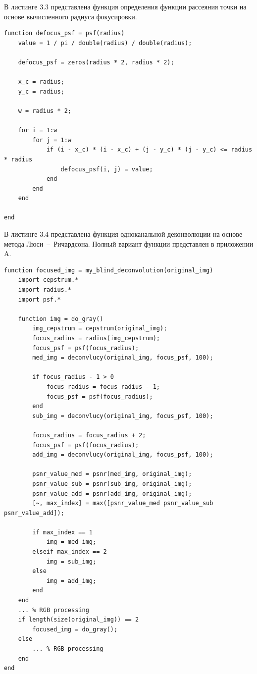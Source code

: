 В листинге 3.3 представлена функция определения функции рассеяния точки на основе вычисленного радиуса фокусировки.

\begin{lstlisting}[caption={Функция определения ФРТ}]
function defocus_psf = psf(radius)
	value = 1 / pi / double(radius) / double(radius);
	
	defocus_psf = zeros(radius * 2, radius * 2);
	
	x_c = radius;
	y_c = radius;
	
	w = radius * 2;
	
	for i = 1:w
		for j = 1:w
			if (i - x_c) * (i - x_c) + (j - y_c) * (j - y_c) <= radius * radius
				defocus_psf(i, j) = value;
			end
		end
	end

end
\end{lstlisting}

\clearpage

В листинге 3.4 представлена функция одноканальной деконволюции на основе метода Люси~--~Ричардсона. Полный вариант функции представлен в приложении A.

\begin{lstlisting}[caption={Функция деконволюции на основе метода Люси~--~Ричардсона}]
function focused_img = my_blind_deconvolution(original_img)
	import cepstrum.*
	import radius.*
	import psf.*

	function img = do_gray()
		img_cepstrum = cepstrum(original_img);
		focus_radius = radius(img_cepstrum);
		focus_psf = psf(focus_radius);
		med_img = deconvlucy(original_img, focus_psf, 100);

		if focus_radius - 1 > 0
			focus_radius = focus_radius - 1;
			focus_psf = psf(focus_radius);
		end
		sub_img = deconvlucy(original_img, focus_psf, 100);
		
		focus_radius = focus_radius + 2;
		focus_psf = psf(focus_radius);
		add_img = deconvlucy(original_img, focus_psf, 100);
		
		psnr_value_med = psnr(med_img, original_img);
		psnr_value_sub = psnr(sub_img, original_img);
		psnr_value_add = psnr(add_img, original_img);
		[~, max_index] = max([psnr_value_med psnr_value_sub psnr_value_add]);

		if max_index == 1
			img = med_img;
		elseif max_index == 2
			img = sub_img;
		else
			img = add_img;
		end
	end
	... % RGB processing
	if length(size(original_img)) == 2
		focused_img = do_gray();
	else
		... % RGB processing
	end
end
\end{lstlisting}

